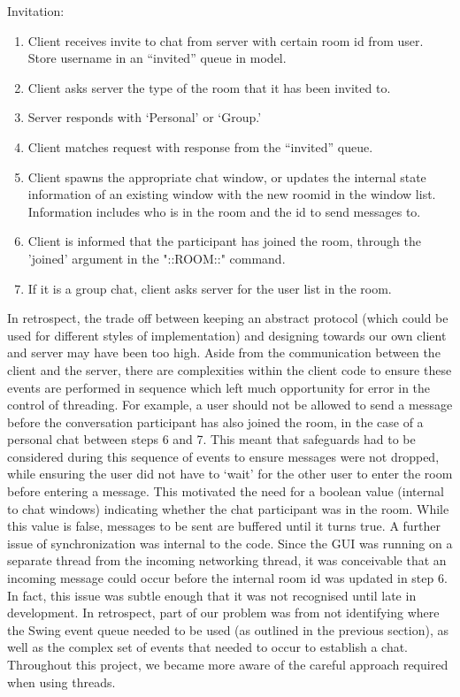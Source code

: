 Invitation:
\begin{enumerate}
\item Client receives invite to chat from server with certain room id from user. Store username in an ``invited'' queue in model.  
\item Client asks server the type of the room that it has been invited to.
\item Server responds with `Personal' or `Group.'
\item Client matches request with response from the ``invited'' queue.
\item Client spawns the appropriate chat window, or updates the internal state information of an existing window with the new roomid in the window list. Information includes who is in the room and the id to send messages to.
\item Client is informed that the participant has joined the room, through the 'joined' argument in the "::ROOM::" command.
\item If it is a group chat, client asks server for the user list in the room.
\end{enumerate}

In retrospect, the trade off between keeping an abstract protocol (which could be used for different styles of implementation) and designing towards our own client and server may have been too high. Aside from the communication between the client and the server, there are complexities within the client code to ensure these events are performed in sequence which left much opportunity for error in the control of threading. For example, a user should not be allowed to send a message before the conversation participant has also joined the room, in the case of a personal chat between steps 6 and 7. This meant that safeguards had to be considered during this sequence of events to ensure messages were not dropped, while ensuring the user did not have to `wait' for the other user to enter the room before entering a message. This motivated the need for a boolean value (internal to chat windows) indicating whether the chat participant was in the room. While this value is false, messages to be sent are buffered until it turns true. A further issue of synchronization was internal to the code. Since the GUI was running on a separate thread from the incoming networking thread, it was conceivable that an incoming message could occur before the internal room id was updated in step 6. In fact, this issue was subtle enough that it was not recognised until late in development. In retrospect, part of our problem was from not identifying where the Swing event queue needed to be used (as outlined in the previous section), as well as the complex set of events that needed to occur to establish a chat. Throughout this project, we became more aware of the careful approach required when using threads.

